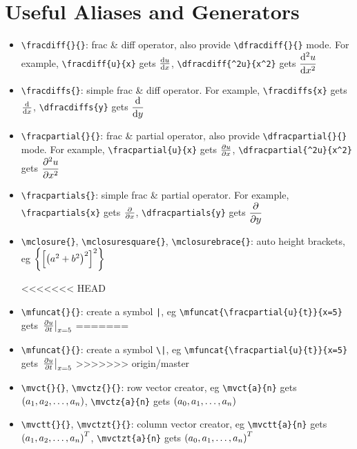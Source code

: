 \documentclass{article}
\begin{document}
\section{Useful Aliases and Generators}
\begin{itemize}
\item \lstinline`\fracdiff{}{}`: frac \& diff operator, also provide \lstinline`\dfracdiff{}{}` mode. For example, \lstinline`\fracdiff{u}{x}` gets ${\frac{\operatorname{d\!} {u}}{\operatorname{d\!} {x}}}$, \lstinline`\dfracdiff{^2u}{x^2}` gets ${\dfrac{\operatorname{d\!} {^2u}}{\operatorname{d\!} {x^2}}}$

\item \lstinline`\fracdiffs{}`: simple frac \& diff operator. For example, \lstinline`\fracdiffs{x}` gets ${{\frac{\operatorname{d\!} {}}{\operatorname{d\!} {x}}}}$, \lstinline`\dfracdiffs{y}` gets ${{\dfrac{\operatorname{d\!} {}}{\operatorname{d\!} {y}}}}$

\item \lstinline`\fracpartial{}{}`: frac \& partial operator, also provide \lstinline`\dfracpartial{}{}` mode. For example, \lstinline`\fracpartial{u}{x}` gets ${\frac{\partial {u}}{\partial {x}}}$, \lstinline`\dfracpartial{^2u}{x^2}` gets ${\dfrac{\partial {^2u}}{\partial {x^2}}}$

\item \lstinline`\fracpartials{}`: simple frac \& partial operator. For example, \lstinline`\fracpartials{x}` gets ${{\frac{\partial {}}{\partial {x}}}}$, \lstinline`\dfracpartials{y}` gets ${{\dfrac{\partial {}}{\partial {y}}}}$

\item \lstinline`\mclosure{}`, \lstinline`\mclosuresquare{}`, \lstinline`\mclosurebrace{}`: auto height brackets, eg ${\left\{ { {\left[ { {\left( {a^2 + b^2} \right)}^2 } \right]}^2 } \right\}}$

<<<<<<< HEAD
\item \lstinline`\mfuncat{}{}`: create a symbol \lstinline`|`, eg \lstinline`\mfuncat{\fracpartial{u}{t}}{x=5}` gets ${\left.{{\frac{\partial {u}}{\partial {t}}}} \right|}_{x=5}$
=======
\item \lstinline`\mfuncat{}{}`: create a symbol \lstinline`\|`, eg \lstinline`\mfuncat{\fracpartial{u}{t}}{x=5}` gets ${\left.{{\frac{\partial {u}}{\partial {t}}}} \right|}_{x=5}$
>>>>>>> origin/master

\item \lstinline`\mvct{}{}`, \lstinline`\mvctz{}{}`: row vector creator, eg \lstinline`\mvct{a}{n}` gets ${ ({a}_1, {a}_2, \ldots, {a}_{n}) }$, \lstinline`\mvctz{a}{n}` gets ${ ({a}_0, {a}_1, \ldots, {a}_{n}) }$

\item \lstinline`\mvctt{}{}`, \lstinline`\mvctzt{}{}`: column vector creator, eg \lstinline`\mvctt{a}{n}` gets ${ { ({a}_1, {a}_2, \ldots, {a}_{n}) }^T }$, \lstinline`\mvctzt{a}{n}` gets ${ { ({a}_0, {a}_1, \ldots, {a}_{n}) }^T }$


\end{itemize}
\end{document}
